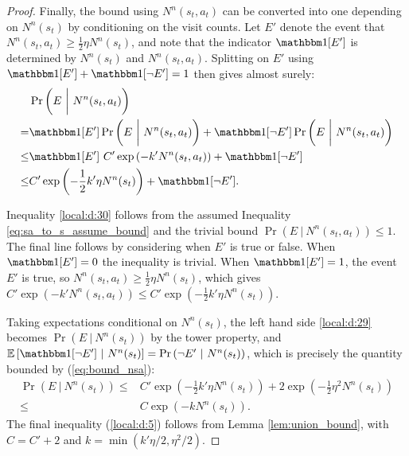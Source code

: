 \begin{proof}
        Finally, the bound using $N^n(s_t,a_t)$ can be converted into one depending on $N^n(s_t)$ by conditioning on the visit counts. Let $E'$ denote the event that $N^n(s_t,a_t) \geq \frac{1}{2}\eta N^n(s_t)$, and note that the indicator $\one[E']$ is determined by $N^n(s_t)$ and $N^n(s_t,a_t)$. Splitting on $E'$ using $\one[E']+\one[\lnot E']=1$ then gives almost surely:
        \begin{align}
             & \Pr\left( E\ \bigg|\ N^n(s_t,a_t) \right) \label{local:d:29} \\
                = & \one[E']\Pr\left( E\ \bigg|\ N^n(s_t,a_t) \right)
                    + \one[\lnot E']\Pr\left( E\ \bigg|\ N^n(s_t,a_t) \right) \\
                \leq & \one[E']\ C'\exp\left(-k' N^n(s_t,a_t)\right) + \one[\lnot E'] \label{local:d:30} \\
                \leq & C'\exp\left(-\frac{1}{2}k'\eta N^n(s_t) \right) + \one[\lnot E']. \label{local:d:31}
        \end{align}

        Inequality \eqref{local:d:30} follows from the assumed Inequality \ref{eq:sa_to_s_assume_bound} and the trivial bound $\Pr\left( E\ |\ N^n(s_t,a_t) \right) \leq 1$. The final line follows by considering when $E'$ is true or false. When $\one[E']=0$ the inequality is trivial. When $\one[E']=1$, the event $E'$ is true, so $N^n(s_t,a_t) \geq \frac{1}{2}\eta N^n(s_t)$, which gives $C'\exp\left(-k' N^n(s_t,a_t)\right) \leq C'\exp\left(-\frac{1}{2}k'\eta N^n(s_t) \right)$.

        Taking expectations conditional on $N^n(s_t)$, the left hand side \eqref{local:d:29} becomes $\Pr\left( E\ |\ N^n(s_t) \right)$ by the tower property, and $\bb{E}\left[\one[\lnot E']\ |\ N^n(s_t)\right]=\Pr\left(\lnot E'\ |\ N^n(s_t)\right)$, which is precisely the quantity bounded by (\ref{eq:bound_nsa}):
        \begin{align}
            \Pr\left( E\ \bigg|\ N^n(s_t) \right)
                \leq & C'\exp\left(-\frac{1}{2}k'\eta N^n(s_t) \right) +
                    2\exp\left(-\frac{1}{2}\eta^2N^n(s_t)\right) \label{local:d:4} \\
                \leq & C\exp(-k N^n(s_t)). \label{local:d:5}
        \end{align}
        The final inequality (\ref{local:d:5}) follows from Lemma \ref{lem:union_bound}, with $C=C'+2$ and $k = \min(k'\eta/2, \eta^2/2)$.
    \end{proof}

